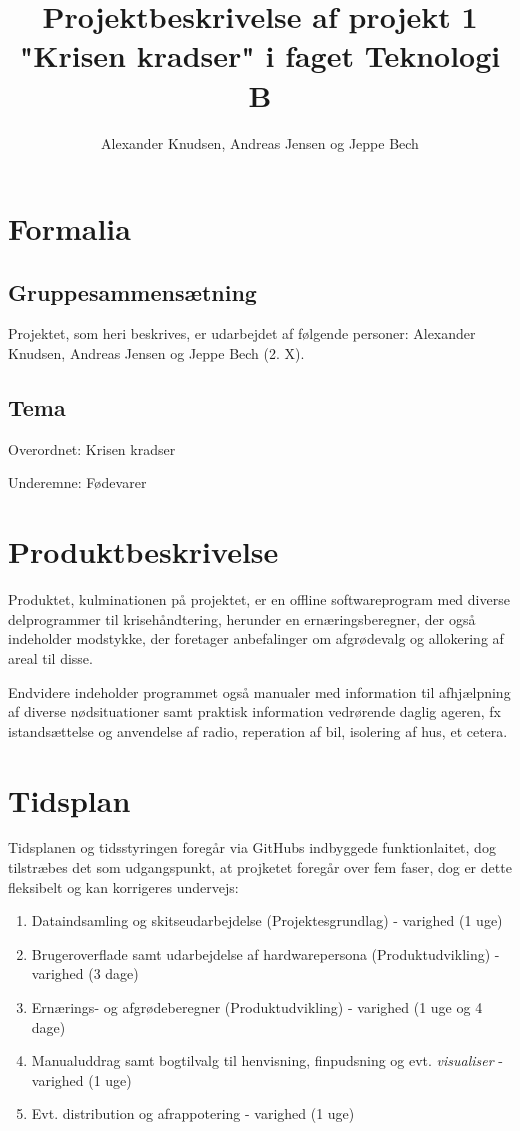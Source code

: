 \documentclass[12pt, a4paper]{article}
\title{Projektbeskrivelse af projekt 1 "Krisen kradser" i faget Teknologi B}
\author{Alexander Knudsen, Andreas Jensen og Jeppe Bech}
\begin{document}
\maketitle
\section{Formalia}
\subsection{Gruppesammensætning}
Projektet, som heri beskrives, er udarbejdet af følgende personer: Alexander Knudsen, Andreas Jensen og Jeppe Bech (2. X).
\subsection{Tema}
Overordnet: Krisen kradser

Underemne: Fødevarer
\section{Produktbeskrivelse}
Produktet, kulminationen på projektet, er en offline softwareprogram med diverse delprogrammer til krisehåndtering, herunder en ernæringsberegner, der også indeholder modstykke, der foretager anbefalinger om afgrødevalg og allokering af areal til disse. 

Endvidere indeholder programmet også manualer med information til afhjælpning af diverse nødsituationer samt praktisk information vedrørende daglig ageren, fx istandsættelse og anvendelse af radio, reperation af bil, isolering af hus, et cetera.
\section{Tidsplan}
Tidsplanen og tidsstyringen foregår via GitHubs indbyggede funktionlaitet, dog tilstræbes det som udgangspunkt, at projketet foregår over fem faser, dog er dette fleksibelt og kan korrigeres undervejs:
\begin{enumerate}
    \item Dataindsamling og skitseudarbejdelse (Projektesgrundlag) - varighed (1 uge)
    \item Brugeroverflade samt udarbejdelse af hardwarepersona (Produktudvikling) - varighed (3 dage)
    \item Ernærings- og afgrødeberegner (Produktudvikling) - varighed (1 uge og 4 dage)
    \item Manualuddrag samt bogtilvalg til henvisning, finpudsning og evt. \textit{visualiser} - varighed (1 uge)
    \item Evt. distribution og afrappotering - varighed (1 uge)
\end{enumerate} 
\end{document}
